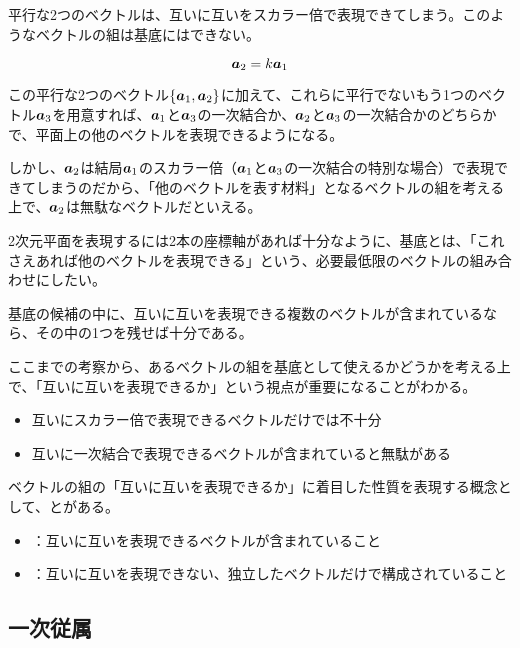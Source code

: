 \documentclass[../../imaging-math]{subfiles}
\begin{document}
平行な2つのベクトルは、互いに互いをスカラー倍で表現できてしまう。このようなベクトルの組は基底にはできない。

\begin{equation*}
  \vb*{a}_2 = k \vb*{a}_1
\end{equation*}

この平行な2つのベクトル$\{\vb*{a}_1,\vb*{a}_2\}$に加えて、これらに平行でないもう1つのベクトル$\vb*{a}_3$を用意すれば、$\vb*{a}_1$と$\vb*{a}_3$の一次結合か、$\vb*{a}_2$と$\vb*{a}_3$の一次結合かのどちらかで、平面上の他のベクトルを表現できるようになる。

しかし、$\vb*{a}_2$は結局$\vb*{a}_1$のスカラー倍（$\vb*{a}_1$と$\vb*{a}_3$の一次結合の特別な場合）で表現できてしまうのだから、「他のベクトルを表す材料」となるベクトルの組を考える上で、$\vb*{a}_2$は無駄なベクトルだといえる。

\br

2次元平面を表現するには2本の座標軸があれば十分なように、基底とは、「これさえあれば他のベクトルを表現できる」という、必要最低限のベクトルの組み合わせにしたい。

基底の候補の中に、互いに互いを表現できる複数のベクトルが含まれているなら、その中の1つを残せば十分である。

\froufrou

ここまでの考察から、あるベクトルの組を基底として使えるかどうかを考える上で、「互いに互いを表現できるか」という視点が重要になることがわかる。

\begin{itemize}
  \item 互いにスカラー倍で表現できるベクトルだけでは不十分
  \item 互いに一次結合で表現できるベクトルが含まれていると無駄がある
\end{itemize}

ベクトルの組の「互いに互いを表現できるか」に着目した性質を表現する概念として、とがある。

\begin{itemize}
  \item {}：互いに互いを表現できるベクトルが含まれていること
  \item {}：互いに互いを表現できない、独立したベクトルだけで構成されていること
\end{itemize}

\subsection{一次従属}
\end{document}
